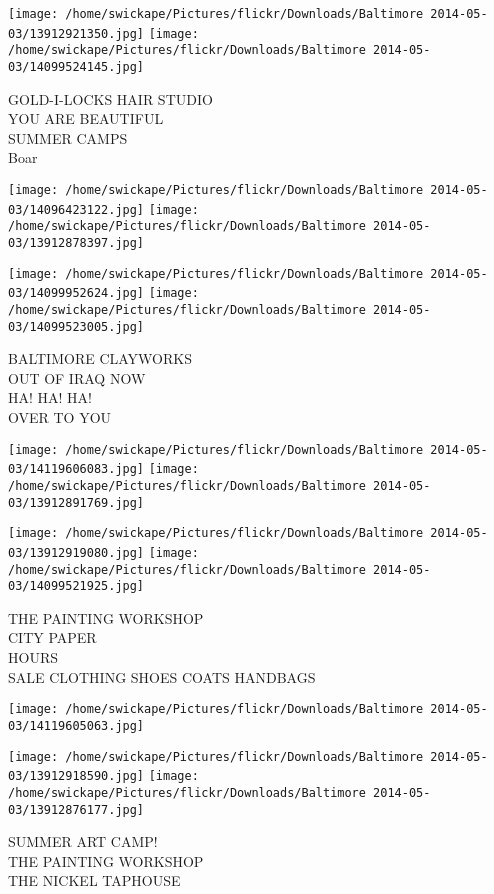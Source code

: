 \documentclass[10pt,letterpaper]{article}
\begin{document}
\texttt{[image: /home/swickape/Pictures/flickr/Downloads/Baltimore 2014-05-03/13912921350.jpg]}
\texttt{[image: /home/swickape/Pictures/flickr/Downloads/Baltimore 2014-05-03/14099524145.jpg]}

GOLD{-}I{-}LOCKS HAIR STUDIO\\
YOU ARE BEAUTIFUL\\
SUMMER CAMPS\\
Boar
\pagebreak

\texttt{[image: /home/swickape/Pictures/flickr/Downloads/Baltimore 2014-05-03/14096423122.jpg]}
\texttt{[image: /home/swickape/Pictures/flickr/Downloads/Baltimore 2014-05-03/13912878397.jpg]}

\texttt{[image: /home/swickape/Pictures/flickr/Downloads/Baltimore 2014-05-03/14099952624.jpg]}
\texttt{[image: /home/swickape/Pictures/flickr/Downloads/Baltimore 2014-05-03/14099523005.jpg]}

BALTIMORE CLAYWORKS\\
OUT OF IRAQ NOW\\
HA! HA! HA!\\
OVER TO YOU
\pagebreak

\texttt{[image: /home/swickape/Pictures/flickr/Downloads/Baltimore 2014-05-03/14119606083.jpg]}
\texttt{[image: /home/swickape/Pictures/flickr/Downloads/Baltimore 2014-05-03/13912891769.jpg]}

\texttt{[image: /home/swickape/Pictures/flickr/Downloads/Baltimore 2014-05-03/13912919080.jpg]}
\texttt{[image: /home/swickape/Pictures/flickr/Downloads/Baltimore 2014-05-03/14099521925.jpg]}

THE PAINTING WORKSHOP\\
CITY PAPER\\
HOURS\\
SALE CLOTHING SHOES COATS HANDBAGS
\pagebreak

\texttt{[image: /home/swickape/Pictures/flickr/Downloads/Baltimore 2014-05-03/14119605063.jpg]}

\vspace{0.25in}
\texttt{[image: /home/swickape/Pictures/flickr/Downloads/Baltimore 2014-05-03/13912918590.jpg]}
\texttt{[image: /home/swickape/Pictures/flickr/Downloads/Baltimore 2014-05-03/13912876177.jpg]}

SUMMER ART CAMP!\\
THE PAINTING WORKSHOP\\
THE NICKEL TAPHOUSE
\pagebreak
\end{document}
